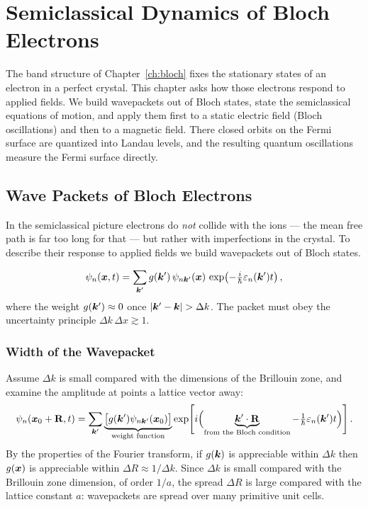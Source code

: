\chapter{Semiclassical Dynamics of Bloch Electrons}
\label{ch:semiclassical}

The band structure of Chapter~\ref{ch:bloch} fixes the stationary states of an electron in a perfect crystal. This chapter asks how those electrons respond to applied fields. We build wavepackets out of Bloch states, state the semiclassical equations of motion, and apply them first to a static electric field (Bloch oscillations) and then to a magnetic field. There closed orbits on the Fermi surface are quantized into Landau levels, and the resulting quantum oscillations measure the Fermi surface directly.

\section{Wave Packets of Bloch Electrons}

In the semiclassical picture electrons do \emph{not} collide with the ions --- the mean free path is far too long for that --- but rather with imperfections in the crystal. To describe their response to applied fields we build wavepackets out of Bloch states.

\begin{definition}
\begin{equation}
    \psi_n(\bm{x},t) = \sum_{\bm{k}'} g(\bm{k}')\, \psi_{n\bm{k}'}(\bm{x})\, \exp\!\left(-\tfrac{i}{\hbar}\varepsilon_n(\bm{k}')t\right),
\end{equation}
where the weight $g(\bm{k}') \approx 0$ once $|\bm{k}'-\bm{k}| > \Delta k$. The packet must obey the uncertainty principle $\Delta k\, \Delta x \gtrsim 1$.
\end{definition}

\subsection{Width of the Wavepacket}

Assume $\Delta k$ is small compared with the dimensions of the Brillouin zone, and examine the amplitude at points a lattice vector away:
\begin{equation}
    \psi_n(\lvect{x}_0 + \cvect{R}, t) = \sum_{\lvect{k}'} \underbrace{\bigl[ g(\lvect{k}')\psi_{n\lvect{k}'}(\lvect{x}_0) \bigr]}_{\text{weight function}}
    \exp\!\left[ i\Bigl( \underbrace{\lvect{k}'\cdot\cvect{R}}_{\text{from the Bloch condition}} - \tfrac{1}{\hbar}\varepsilon_n(\lvect{k}')t \Bigr) \right].
\end{equation}
By the properties of the Fourier transform, if $g(\bm{k})$ is appreciable within $\Delta k$ then $g(\bm{x})$ is appreciable within $\Delta R \approx 1/\Delta k$. Since $\Delta k$ is small compared with the Brillouin zone dimension, of order $1/a$, the spread $\Delta R$ is large compared with the lattice constant $a$: wavepackets are spread over many primitive unit cells.

